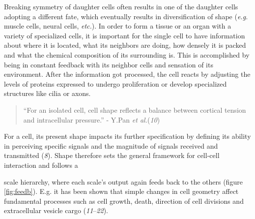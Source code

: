 \documentclass[11pt,singlespacinge,twoside]{reedthesis} %
\theoremstyle{definition}
\theoremstyle{definition}
\theoremstyle{definition}
\theoremstyle{remark}
\begin{document}
Breaking symmetry of daughter cells often results in one of the daughter cells adopting a different fate, which eventually results in diversification of shape (\emph{e.g.} muscle cells, neural cells, \emph{etc.}). In order to form a tissue or an organ with a variety of specialized cells, it is important for the single cell to have information about where it is located, what its neighbors are doing, how densely it is packed and what the chemical composition of its surrounding is. This is accomplished by being in constant feedback with its neighbor cells and sensation of its environment. After the information got processed, the cell reacts by adjusting the levels of proteins expressed to undergo proliferation or develop specialized structures like cilia or axons.
\begin{quote}
``For an isolated cell, cell shape reflects a balance between cortical tension and intracellular pressure.'' - Y.Pan \emph{et al.}(\emph{10})
\end{quote}
For a cell, its present shape impacts its further specification by defining its ability in perceiving specific signals and the magnitude of signals received and transmitted (\emph{8}). Shape therefore sets the general framework for cell-cell interaction and follows a\newline

\newline

scale hierarchy, where each scale's output again feeds back to the others (figure \ref{fig:feedb}). E.g. it has been shown that simple changes in cell geometry affect fundamental processes such as cell growth, death, direction of cell divisions and extracellular vesicle cargo (\emph{11}--\emph{22}).
\end{document}
